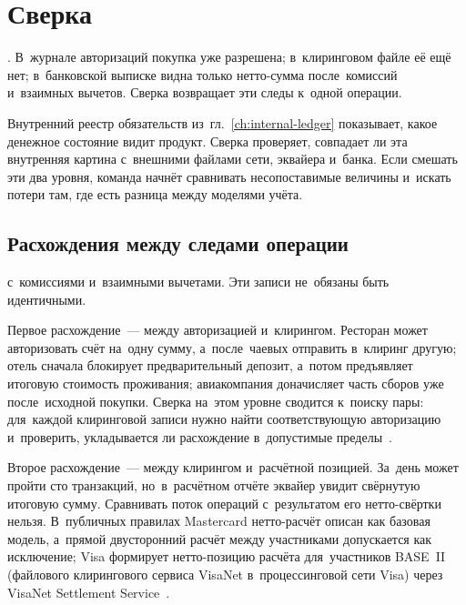 
\chapter{Сверка}\label{ch:reconciliation}

. В~журнале
авторизаций покупка уже разрешена; в~клиринговом файле её ещё нет; в~банковской
выписке видна только нетто-сумма после~комиссий и~взаимных вычетов. Сверка
возвращает эти следы к~одной операции.

Внутренний реестр обязательств из~гл.~\ref{ch:internal-ledger} показывает,
какое денежное состояние видит продукт. Сверка проверяет, совпадает ли эта
внутренняя картина с~внешними файлами сети, эквайера и~банка. Если смешать
эти два уровня, команда начнёт сравнивать несопоставимые величины и~искать
потери там, где есть разница между моделями учёта.

\section{Расхождения между следами операции}\label{sec:recon-gaps}

 с~комиссиями
и~взаимными вычетами. Эти записи не~обязаны быть идентичными.

Первое расхождение~--- между авторизацией и~клирингом. Ресторан может
авторизовать счёт на~одну сумму, а~после~чаевых отправить в~клиринг другую;
отель сначала блокирует предварительный депозит, а~потом предъявляет итоговую
стоимость проживания; авиакомпания доначисляет часть сборов уже после~исходной
покупки. Сверка на~этом уровне сводится к~поиску пары: для~каждой клиринговой
записи нужно найти соответствующую авторизацию и~проверить, укладывается ли
расхождение в~допустимые пределы~\cite{visa-tadg,mc-tpr}.

Второе расхождение~--- между клирингом и~расчётной позицией. За~день может
пройти сто транзакций, но~в~расчётном отчёте эквайер увидит свёрнутую итоговую
сумму. Сравнивать поток операций с~результатом его нетто-свёртки нельзя.
В~публичных правилах Mastercard нетто-расчёт описан как базовая модель, а~прямой
двусторонний расчёт между участниками допускается как исключение; Visa
формирует нетто-позицию расчёта для~участников BASE~II (файлового клирингового
сервиса VisaNet в~процессинговой сети Visa) через VisaNet Settlement
Service~\cite{mc-rules,visa-core-rules,visa-visanet-booklet}.

